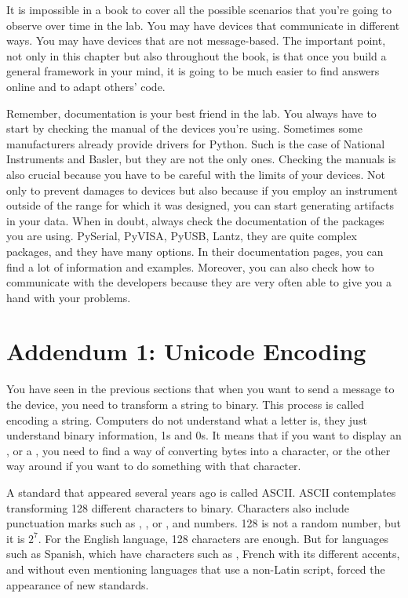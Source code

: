It is impossible in a book to cover all the possible scenarios that you're going to observe over time in the lab. You may have devices that communicate in different ways. You may have devices that are not message-based. The important point, not only in this chapter but also throughout the book, is that once you build a general framework in your mind, it is going to be much easier to find answers online and to adapt others' code.

Remember, documentation is your best friend in the lab. You always have to start by checking the manual of the devices you're using. Sometimes some manufacturers already provide drivers for Python. Such is the case of National Instruments and Basler, but they are not the only ones. Checking the manuals is also crucial because you have to be careful with the limits of your devices. Not only to prevent damages to devices but also because if you employ an instrument outside of the range for which it was designed, you can start generating artifacts in your data. When in doubt, always check the documentation of the packages you are using. PySerial, PyVISA, PyUSB, Lantz, they are quite complex packages, and they have many options. In their documentation pages, you can find a lot of information and examples. Moreover, you can also check how to communicate with the developers because they are very often able to give you a hand with your problems.

\section{Addendum 1: Unicode Encoding}\label{sec:unicode}
You have seen in the previous sections that when you want to send a message to the device, you need to transform a string to binary. This process is called encoding a string. Computers do not understand what a letter is, they just understand binary information, 1s and 0s. It means that if you want to display an , or a , you need to find a way of converting bytes into a character, or the other way around if you want to do something with that character.

A standard that appeared several years ago is called ASCII. ASCII contemplates transforming 128 different characters to binary. Characters also include punctuation marks such as , \py{!}, or \py{:}, and numbers. 128 is not a random number, but it is $2^7$. For the English language, 128 characters are enough. But for languages such as Spanish, which have characters such as , French with its different accents, and without even mentioning languages that use a non-Latin script, forced the appearance of new standards.

